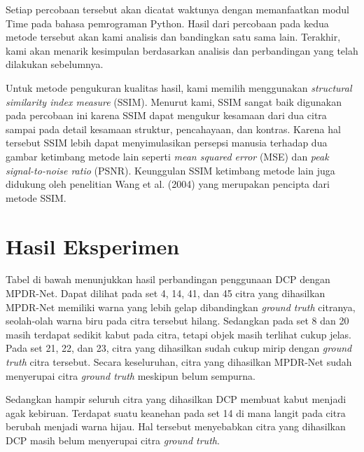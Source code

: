 \documentclass[11pt, a4paper, final]{report}
\begin{document}
Setiap percobaan tersebut akan dicatat waktunya dengan memanfaatkan modul Time pada bahasa pemrograman Python. Hasil dari percobaan pada kedua metode tersebut akan kami analisis dan bandingkan satu sama lain. Terakhir, kami akan menarik kesimpulan berdasarkan analisis dan perbandingan yang telah dilakukan sebelumnya.

Untuk metode pengukuran kualitas hasil, kami memilih menggunakan \textit{structural similarity index measure} (SSIM). Menurut kami, SSIM sangat baik digunakan pada percobaan ini karena SSIM dapat mengukur kesamaan dari dua citra sampai pada detail kesamaan struktur, pencahayaan, dan kontras. Karena hal tersebut SSIM lebih dapat menyimulasikan persepsi manusia terhadap dua gambar ketimbang metode lain seperti \textit{mean squared error} (MSE) dan \textit{peak signal-to-noise ratio} (PSNR). Keunggulan SSIM ketimbang metode lain juga didukung oleh penelitian Wang et al. (2004) yang merupakan pencipta dari metode SSIM.


\newpage
\section{Hasil Eksperimen}

Tabel di bawah menunjukkan hasil perbandingan penggunaan DCP dengan MPDR-Net. Dapat dilihat pada set 4, 14, 41, dan 45 citra yang dihasilkan MPDR-Net memiliki warna yang lebih gelap dibandingkan \textit{ground truth} citranya, seolah-olah warna biru pada citra tersebut hilang. Sedangkan pada set 8 dan 20 masih terdapat sedikit kabut pada citra, tetapi objek masih terlihat cukup jelas. Pada set 21, 22, dan 23, citra yang dihasilkan sudah cukup mirip dengan \textit{ground truth} citra tersebut. Secara keseluruhan, citra yang dihasilkan MPDR-Net sudah menyerupai citra \textit{ground truth} meskipun belum sempurna.

Sedangkan hampir seluruh citra yang dihasilkan DCP membuat kabut menjadi agak kebiruan. Terdapat suatu keanehan pada set 14 di mana langit pada citra berubah menjadi warna hijau. Hal tersebut menyebabkan citra yang dihasilkan DCP masih belum menyerupai citra \textit{ground truth}.
\end{document}

